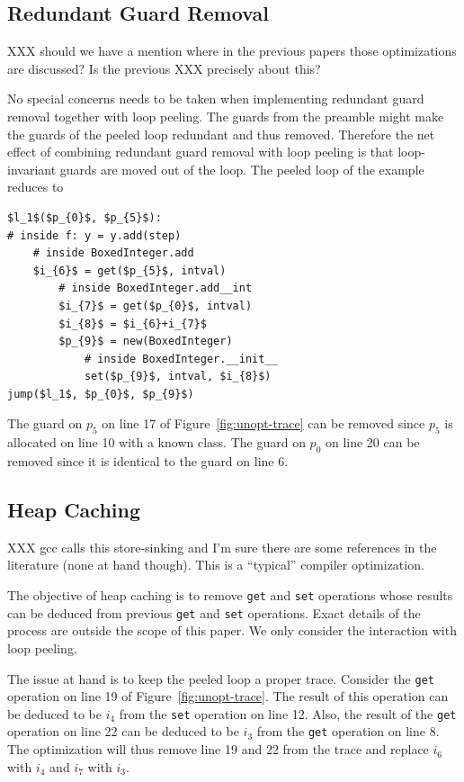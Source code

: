 \documentclass[preprint]{sigplanconf}
\begin{document}
\subsection{Redundant Guard Removal}

XXX should we have a mention where in the previous papers those optimizations
are discussed? Is the previous XXX precisely about this?

No special concerns needs to be taken when implementing redundant
guard removal together with loop peeling. The guards from
the preamble might make the guards of the peeled loop
redundant and thus removed. Therefore the net effect of combining redundant
guard removal with loop peeling is that loop-invariant guards are moved out of the
loop. The peeled loop of the example reduces to

\begin{lstlisting}[mathescape,numbers = right,basicstyle=\setstretch{1.05}\ttfamily\scriptsize]
$l_1$($p_{0}$, $p_{5}$):
# inside f: y = y.add(step)
    # inside BoxedInteger.add
    $i_{6}$ = get($p_{5}$, intval)
        # inside BoxedInteger.add__int
        $i_{7}$ = get($p_{0}$, intval)
        $i_{8}$ = $i_{6}+i_{7}$
        $p_{9}$ = new(BoxedInteger)
            # inside BoxedInteger.__init__
            set($p_{9}$, intval, $i_{8}$)
jump($l_1$, $p_{0}$, $p_{9}$)
\end{lstlisting}

The guard on $p_5$ on line 17 of Figure~\ref{fig:unopt-trace} can be
removed since $p_5$ is allocated on line 10 with a known class. The
guard on $p_0$ on line 20 can be removed since it is identical to the
guard on line 6.

\subsection{Heap Caching}

XXX gcc calls this store-sinking and I'm sure there are some
references in the literature (none at hand though). This is a ``typical''
compiler optimization.

The objective of heap caching is to remove \lstinline{get} and
\lstinline{set} operations whose results can be deduced from previous
\lstinline{get} and \lstinline{set} operations. Exact details of the
process are outside the scope of this paper. We only consider the interaction
with loop peeling.

The issue at hand is to keep the peeled loop a proper
trace. Consider the \lstinline{get} operation on line 19 of
Figure~\ref{fig:unopt-trace}. The result of this operation can be
deduced to be $i_4$ from the \lstinline{set} operation on line
12. Also, the result of the \lstinline{get} operation on line 22 can
be deduced to be $i_3$ from the \lstinline{get} operation on line
8. The optimization will thus remove line 19 and 22 from the trace and
replace $i_6$ with $i_4$ and $i_7$ with $i_3$. 
\end{document}
